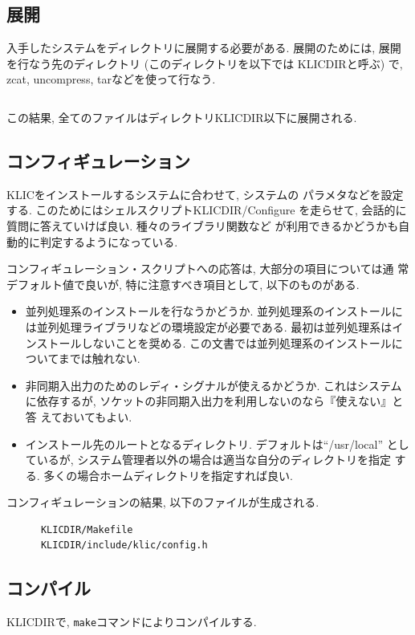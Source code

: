 \documentclass[a4,titlepage]{jsreport}
\begin{document}
\subsection{展開}
入手したシステムをディレクトリに展開する必要がある.  
展開のためには, 展開を行なう先のディレクトリ (このディレクトリを以下では
KLICDIRと呼ぶ) で, 
zcat, uncompress, tarなどを使って行なう.  

\begin{Verbatim}[frame=single]
% zcat ``ftpしてきたファイル'' | tar xf -
\end{Verbatim}

この結果, 全てのファイルはディレクトリKLICDIR以下に展開される.  

\subsection{コンフィギュレーション}
KLICをインストールするシステムに合わせて, システムの
パラメタなどを設定する.  このためにはシェルスクリプトKLICDIR/Configure
を走らせて, 会話的に質問に答えていけば良い.  種々のライブラリ関数など
が利用できるかどうかも自動的に判定するようになっている.

コンフィギュレーション・スクリプトへの応答は, 大部分の項目については通
常デフォルト値で良いが, 特に注意すべき項目として, 以下のものがある.
\begin{itemize}
\item
並列処理系のインストールを行なうかどうか.  並列処理系のインストールに
は並列処理ライブラリなどの環境設定が必要である.  最初は並列処理系はイ
ンストールしないことを奨める.  この文書では並列処理系のインストールに
ついてまでは触れない.
\item
非同期入出力のためのレディ・シグナルが使えるかどうか.  これはシステム
に依存するが, ソケットの非同期入出力を利用しないのなら『使えない』と答
えておいてもよい.
\item
インストール先のルートとなるディレクトリ.  デフォルトは``/usr/local''
としているが, システム管理者以外の場合は適当な自分のディレクトリを指定
する.  多くの場合ホームディレクトリを指定すれば良い.
\end{itemize}
コンフィギュレーションの結果, 以下のファイルが生成される.
\begin{verbatim}
      KLICDIR/Makefile
      KLICDIR/include/klic/config.h
\end{verbatim}

\subsection{コンパイル}
KLICDIRで, \verb|make|コマンドによりコンパイルする.  
\end{document}
